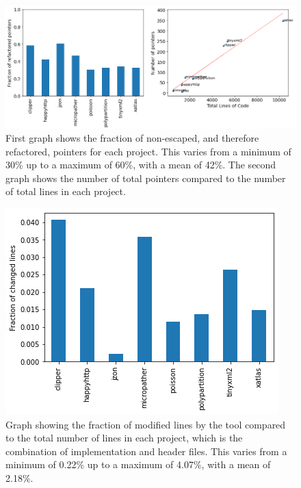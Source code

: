 \documentclass{mpaper}
\begin{document}
    \begin{figure}
        \centering
        \includegraphics[scale=0.55]{images/pointers.png}
        \caption{First graph shows the fraction of non-escaped, and therefore refactored, pointers for each project. This varies from a minimum of 30\% up to a maximum of 60\%, with a mean of 42\%. The second graph shows the number of total pointers compared to the number of total lines in each project.}
        \label{fig:ratio-pointer}
    \end{figure}
    
    \begin{figure}
        \centering
        \includegraphics[scale=0.8]{images/lines.png}
        \caption{Graph showing the fraction of modified lines by the tool compared to the total number of lines in each project, which is the combination of implementation and header files. This varies from a minimum of 0.22\% up to a maximum of 4.07\%, with a mean of 2.18\%.}
        \label{fig:lines}
    \end{figure}
\end{document}

